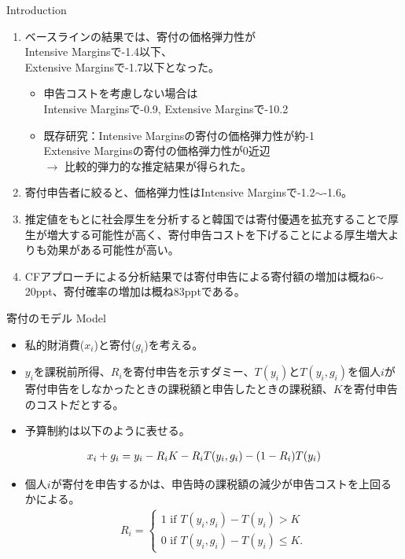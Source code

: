 \documentclass[dvipdfmx,10pt]{beamer}
\begin{document}
	\begin{frame}{Introduction}
		\protect\hypertarget{introduction-2}{}
		
		\begin{enumerate}
			\item ベースラインの結果では、寄付の価格弾力性が\\
			Intensive Marginsで-1.4以下、\\
			Extensive Marginsで-1.7以下となった。
			\begin{itemize}
				\item 申告コストを考慮しない場合は\\
				Intensive Marginsで-0.9, Extensive Marginsで-10.2
				\item 既存研究：Intensive Marginsの寄付の価格弾力性が約-1\\
				Extensive Marginsの寄付の価格弾力性が0近辺\\
				$\to$ 比較的弾力的な推定結果が得られた。
			\end{itemize}
			\item 寄付申告者に絞ると、価格弾力性はIntensive Marginsで-1.2\(\sim\)-1.6。
			\item 推定値をもとに社会厚生を分析すると韓国では寄付優遇を拡充することで厚生が増大する可能性が高く、寄付申告コストを下げることによる厚生増大よりも効果がある可能性が高い。
			\item CFアプローチによる分析結果では寄付申告による寄付額の増加は概ね6$\sim$20ppt、寄付確率の増加は概ね83pptである。
		\end{enumerate}
	\end{frame}
		
	\begin{frame}{寄付のモデル}
		Model
		\begin{itemize}
			\item 私的財消費(\(x_{i}\))と寄付(\(g_{i}\))を考える。
			\item \(y_{i}\)を課税前所得、\(R_{i}\)を寄付申告を示すダミー、\(T(y_i)\)と\(T(y_{i}, g_{i})\)を個人$i$が寄付申告をしなかったときの課税額と申告したときの課税額、$K$を寄付申告のコストだとする。
			\item 予算制約は以下のように表せる。
		\end{itemize}
		\begin{align}
		x_{i} + g_{i} = y_{i} - R_iK- R_iT(y_{i}, g_{i})-(1-R_i)T(y_i)\notag
		\end{align}
		\begin{itemize}
			\item 個人$i$が寄付を申告するかは、申告時の課税額の減少が申告コストを上回るかによる。
			\begin{align}
				R_i=\begin{cases}
					1 \text{ if }T(y_i, g_i) - T(y_i)>K\\
					0 \text{ if }T(y_i, g_i) - T(y_i)\le K.
				\end{cases}
			\end{align}
		\end{itemize}
	\end{frame}
	
\end{document}
